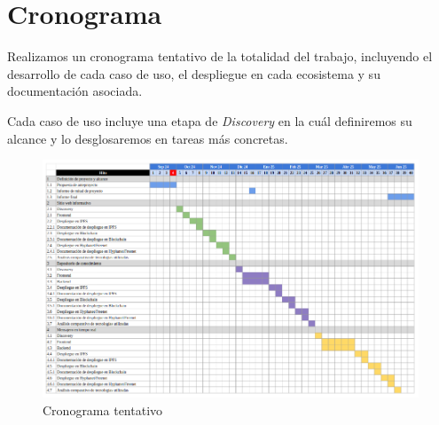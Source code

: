 \section{Cronograma}

Realizamos un cronograma tentativo de la totalidad del trabajo, incluyendo el desarrollo de cada caso de uso, el despliegue en cada ecosistema y su documentación asociada.

Cada caso de uso incluye una etapa de \textit{Discovery} en la cuál definiremos su alcance y lo desglosaremos en tareas más concretas.

\begin{figure}[H]
    \includegraphics[width=1\linewidth]{img/cronograma.png}
    \caption{Cronograma tentativo}
    \label{fig:enter-label}
\end{figure}

